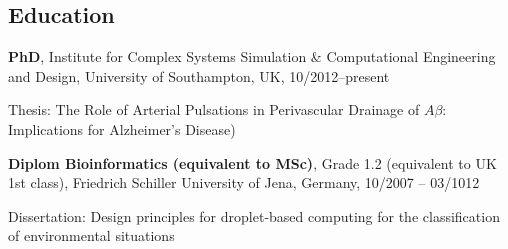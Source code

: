 \documentclass[margin,line]{res}
\newenvironment{list1}{
  \begin{list}{\ding{113}}{%
      \setlength{\itemsep}{0in}
      \setlength{\parsep}{0in} \setlength{\parskip}{0in}
      \setlength{\topsep}{0in} \setlength{\partopsep}{0in} 
      \setlength{\leftmargin}{0.17in}}}{\end{list}}
\begin{document}

\address{{\it E-Mail:} A.K.Diem@soton.ac.uk, www.akdiem.com}

\begin{resume}



\section{\sc Education}
{\bf PhD}, Institute for Complex Systems Simulation \& Computational Engineering and Design, University of Southampton, UK, 10/2012--present\\
\vspace*{-.1in}
\begin{list1}
\item[] Thesis: The Role of Arterial Pulsations in Perivascular Drainage of $A\beta$: Implications for Alzheimer's Disease)
\end{list1}
\vspace*{-.1in}

{\bf Diplom Bioinformatics (equivalent to MSc)}, Grade 1.2 (equivalent to UK 1st class), Friedrich Schiller University of Jena, Germany, 10/2007 -- 03/1012\\
\vspace*{-.1in}
\begin{list1}
\item[] Dissertation: Design principles for droplet-based computing for the classification of environmental situations
\end{list1}
\vspace*{-.1in}


\end{resume}
\end{document}
